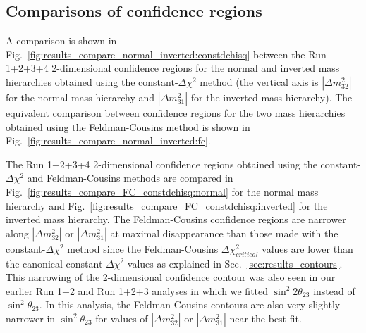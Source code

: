 \clearpage


\subsection {Comparisons of confidence regions}
\label{sec:results_contour_comparisons}

A comparison is shown in Fig.\ \ref{fig:results_compare_normal_inverted:constdchisq}
between the Run 1+2+3+4 2-dimensional confidence regions for the normal and inverted mass hierarchies  
obtained using the constant-$\Delta\chi^2$ method (the vertical axis is $|\Delta m_{32}^{2}|$ for the normal mass hierarchy and 
$|\Delta m_{31}^{2}|$ for the inverted mass hierarchy). The equivalent comparison between confidence regions for the two mass 
hierarchies obtained using the Feldman-Cousins method is shown in Fig.\ \ref{fig:results_compare_normal_inverted:fc}.

The Run 1+2+3+4 2-dimensional confidence regions obtained using the constant-$\Delta\chi^2$ and Feldman-Cousins methods
are compared in Fig.\ \ref{fig:results_compare_FC_constdchisq:normal} for the normal mass hierarchy and 
Fig.\ \ref{fig:results_compare_FC_constdchisq:inverted} for the inverted mass hierarchy.
The Feldman-Cousins confidence regions are narrower along $|\Delta{m^{2}_{32}}|$ or $|\Delta{m^{2}_{31}}|$ at maximal disappearance than
those made with the constant-$\Delta\chi^{2}$ method since the Feldman-Cousins $\Delta\chi^2_{critical}$ values are lower 
than the canonical constant-$\Delta\chi^2$ values as explained in Sec.\ \ref{sec:results_contours}. This narrowing of the 
2-dimensional confidence contour was also seen in our earlier Run 1+2 and Run 1+2+3 analyses 
\cite{OurRun12DisappAnalysis,OurRun123DisappAnalysis3Flavour} in which we fitted 
$\sin^{2}{2\theta_{23}}$ instead of $\sin^{2}{\theta_{23}}$. In this analysis, the Feldman-Cousins contours are also 
very slightly narrower in $\sin^{2}{\theta_{23}}$ for values of $|\Delta{m^{2}_{32}}|$ or $|\Delta{m^{2}_{31}}|$ near the best fit.


